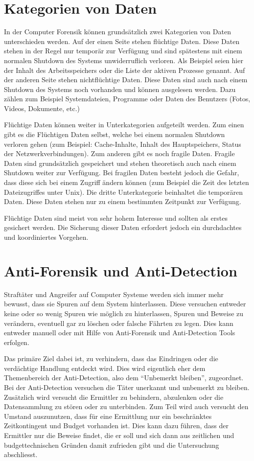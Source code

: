 \section{Kategorien von Daten}
In der Computer Forensik können grundsätzlich zwei Kategorien von Daten unterschieden werden. Auf der einen Seite stehen flüchtige Daten. Diese Daten stehen in der Regel nur temporär zur Verfügung und sind spätestens mit einem normalen Shutdown des Systems unwiderruflich verloren. Als Beispiel seien hier der Inhalt des Arbeitsspeichers oder die Liste der aktiven Prozesse genannt. Auf der anderen Seite stehen nichtflüchtige Daten. Diese Daten sind auch nach einem Shutdown des Systems noch vorhanden und können ausgelesen werden. Dazu zählen zum Beispiel Systemdateien, Programme oder Daten des Benutzers (Fotos, Videos, Dokumente, etc.)

Flüchtige Daten können weiter in Unterkategorien aufgeteilt werden. Zum einen gibt es die Flüchtigen Daten selbst, welche bei einem normalen Shutdown verloren gehen (zum Beispiel: Cache-Inhalte, Inhalt des Hauptspeichers, Status der Netzwerkverbindungen). Zum anderen gibt es noch fragile Daten. Fragile Daten sind grundsätzlich gespeichert und stehen theoretisch auch nach einem Shutdown weiter zur Verfügung. Bei fragilen Daten besteht jedoch die Gefahr, dass diese sich bei einem Zugriff ändern können (zum Beispiel die Zeit des letzten Dateizugriffes unter Unix). Die dritte Unterkategorie beinhaltet die temporären Daten. Diese Daten stehen nur zu einem bestimmten Zeitpunkt zur Verfügung.

Flüchtige Daten sind meist von sehr hohem Interesse und sollten als erstes gesichert werden. Die Sicherung dieser Daten erfordert jedoch ein durchdachtes und koordiniertes Vorgehen.

\section{Anti-Forensik und Anti-Detection}
Straftäter und Angreifer auf Computer Systeme werden sich immer mehr bewusst, dass sie Spuren auf dem System hinterlassen. Diese versuchen entweder keine oder so wenig Spuren wie möglich zu hinterlassen, Spuren und Beweise zu verändern,  eventuell gar zu löschen oder falsche Fährten zu legen. Dies kann entweder manuell oder mit Hilfe von Anti-Forensik und Anti-Detection Tools erfolgen.

Das primäre Ziel dabei ist, zu verhindern, dass das Eindringen oder die verdächtige Handlung entdeckt wird. Dies wird eigentlich eher dem Themenbereich der Anti-Detection, also dem "`Unbemerkt bleiben"', zugeordnet. Bei der Anti-Detection versuchen die Täter unerkannt und unbemerkt zu bleiben. Zusätzlich wird versucht die Ermittler zu behindern, abzulenken oder die Datensammlung zu stören oder zu unterbinden. Zum Teil wird auch versucht den Umstand auszunutzen, dass für eine Ermittlung nur ein beschränktes Zeitkontingent und Budget vorhanden ist. Dies kann dazu führen, dass der Ermittler nur die Beweise findet, die er soll und sich dann aus zeitlichen und budgettechnischen Gründen damit zufrieden gibt und die Untersuchung abschliesst.

